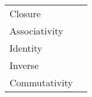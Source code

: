\documentclass[a4paper,12pt]{scrartcl}    %
\begin{document}
\begin{landscape}
\begin{minipage}[t][]{0.60 \linewidth}
\begin{minipage}[c]{0,5\textwidth}
\begin{tabular}{|l|p{2cm}|}
			  \hline
			   \cellcolor{blue!25} Closure&  \\
			    \cellcolor{blue!25} Associativity&  \\
			    \cellcolor{blue!25} Identity&  \\
			    \cellcolor{blue!25} Inverse&  \\
			    \cellcolor{blue!25} Commutativity&  \\
			  \hline
			\end{tabular}
			\vfill
		\end{minipage}
	\end{minipage}	





\end{landscape}
\end{document}
